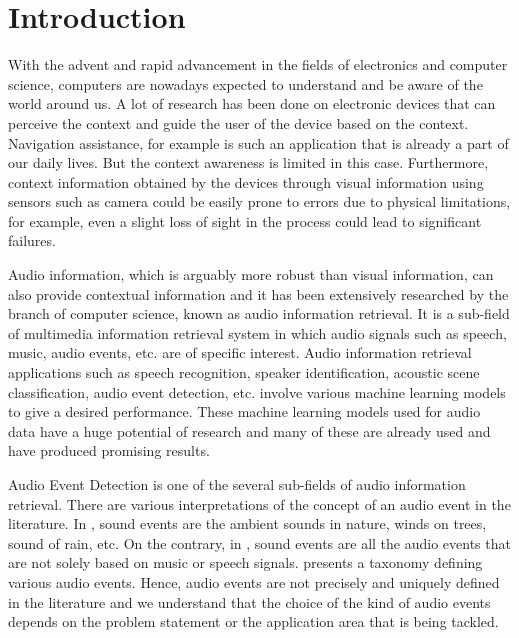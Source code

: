 \chapter*{Introduction}

With the advent and rapid advancement in the fields of electronics and computer science, computers are nowadays expected to understand and be aware of the world around us. A lot of research has been done on electronic devices that can perceive the context and guide the user of the device based on the context. Navigation assistance, for example is such an application that is already a part of our daily lives. But the context awareness is limited in this case. Furthermore, context information obtained by the devices through visual information using sensors such as camera could be easily prone to errors due to physical limitations, for example, even a  slight loss of sight in the process could lead to significant failures. 

Audio information, which is arguably more robust than visual information, can also provide contextual information and it has been extensively researched by the branch of computer science, known as audio information retrieval. It is a sub-field of multimedia information retrieval system in which audio signals such as speech, music, audio events, etc. are of specific interest. Audio information retrieval applications such as speech recognition, speaker identification, acoustic scene classification, audio event detection, etc. involve various machine learning models to give a desired performance. These machine learning models used for audio data have a huge potential of research and many of these are already used and have produced promising results.

Audio Event Detection is one of the several sub-fields of audio information retrieval. There are various interpretations of the concept of an audio event in the literature. In \cite{chu2009environmental}, sound events are the ambient sounds in nature, winds on trees, sound of rain, etc. On the contrary, in \cite{tran2011sound}, sound events are all the audio events that are not solely based on music or speech signals. \cite{salamon2014dataset} presents a taxonomy defining various audio events. Hence, audio events are not precisely and uniquely defined in the literature and we understand that the choice of the kind of audio events depends on the problem statement or the application area that is being tackled. 

